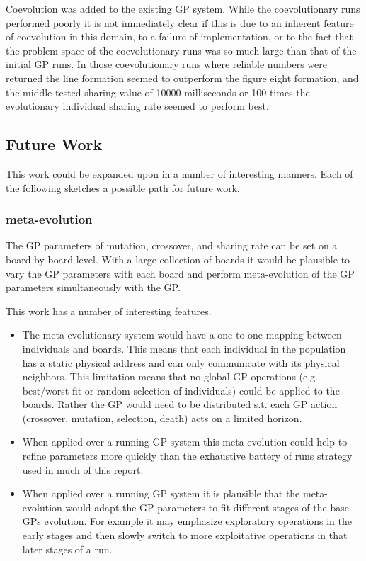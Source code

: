 \documentclass[11pt]{article}
\begin{document}
Coevolution was added to the existing GP system.  While the
coevolutionary runs performed poorly it is not immediately clear if
this is due to an inherent feature of coevolution in this domain, to a
failure of implementation, or to the fact that the problem space of
the coevolutionary runs was so much large than that of the initial GP
runs.  In those coevolutionary runs where reliable numbers were
returned the line formation seemed to outperform the figure eight
formation, and the middle tested sharing value of 10000 milliseconds
or 100 times the evolutionary individual sharing rate seemed to
perform best.

\subsection*{Future Work}
\label{sec-1.7}

This work could be expanded upon in a number of interesting manners.
Each of the following sketches a possible path for future work.

\subsubsection*{meta-evolution}
\label{sec-1.7.1}

The GP parameters of mutation, crossover, and sharing rate can be set
on a board-by-board level.  With a large collection of boards it would
be plausible to vary the GP parameters with each board and perform
meta-evolution of the GP parameters simultaneously with the GP.

This work has a number of interesting features.
\begin{itemize}
\item The meta-evolutionary system would have a one-to-one mapping between
  individuals and boards.  This means that each individual in the
  population has a static physical address and can only communicate
  with its physical neighbors.  This limitation means that no global
  GP operations (e.g. best/worst fit or random selection of
  individuals) could be applied to the boards.  Rather the GP would
  need to be distributed s.t. each GP action (crossover, mutation,
  selection, death) acts on a limited horizon.
\item When applied over a running GP system this meta-evolution could help
  to refine parameters more quickly than the exhaustive battery of
  runs strategy used in much of this report.
\item When applied over a running GP system it is plausible that the
  meta-evolution would adapt the GP parameters to fit different stages
  of the base GPs evolution.  For example it may emphasize exploratory
  operations in the early stages and then slowly switch to more
  exploitative operations in that later stages of a run.
\end{itemize}
\end{document}
